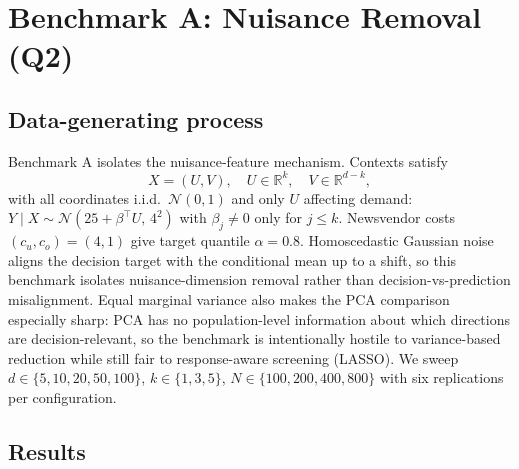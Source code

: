 \documentclass[11pt]{article}
\begin{document}
\section{Benchmark A: Nuisance Removal (Q2)}\label{sec:benchA}
\subsection*{Data-generating process}
Benchmark A isolates the nuisance-feature mechanism. Contexts satisfy
\[
X=(U,V), \quad U\in\mathbb R^k,\quad V\in\mathbb R^{d-k},
\]
with all coordinates i.i.d.\ $\mathcal N(0,1)$ and only $U$ affecting demand: $Y\mid X\sim \mathcal N(25+\beta^\top U,\,4^2)$ with $\beta_j\ne 0$ only for $j\le k$. Newsvendor costs $(c_u,c_o)=(4,1)$ give target quantile $\alpha=0.8$. Homoscedastic Gaussian noise aligns the decision target with the conditional mean up to a shift, so this benchmark isolates nuisance-dimension removal rather than decision-vs-prediction misalignment. Equal marginal variance also makes the PCA comparison especially sharp: PCA has no population-level information about which directions are decision-relevant, so the benchmark is intentionally hostile to variance-based reduction while still fair to response-aware screening (LASSO). We sweep $d\in\{5,10,20,50,100\}$, $k\in\{1,3,5\}$, $N\in\{100,200,400,800\}$ with six replications per configuration.

\subsection*{Results}
\begin{table}[H]
\centering
\small
\resizebox{\textwidth}{!}{%

}
\caption{Benchmark A regret snapshot at $N=400$ together with each supervised reducer's emphasis on the true signal block. For learned metrics, this is diagonal mass share; for SOF and LASSO$\to$SOF, it is split-frequency share.}
\label{tab:benchmark_a_snapshot}
\end{table}
\end{document}
